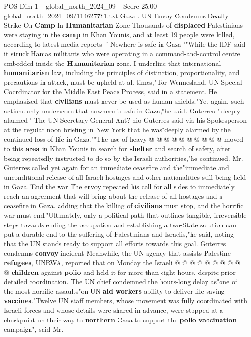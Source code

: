 \begin{textsample}{POS Dim 1 – global\_north\_2024\_09 – Score 25.00 – global\_north\_2024\_09/114627781.txt}  \label{ex:f1_pos_428}
Gaza : UN Envoy Condemns Deadly Strike On \textbf{Camp} In \textbf{Humanitarian} Zone Thousands of \textbf{displaced} Palestinians were staying in the \textbf{camp} in Khan Younis, and at least 19 people were killed, according to latest media reports. ' Nowhere is safe in Gaza '"While the IDF said it struck Hamas militants who were operating in a command-and-control centre embedded inside the \textbf{Humanitarian} zone, I underline that international \textbf{humanitarian} law, including the principles of distinction, proportionality, and precautions in attack, must be upheld at all times,"Tor Wennesland, UN Special Coordinator for the Middle East Peace Process, said in a statement.
He emphasized that \textbf{civilians} must never be used as human shields."Yet again, such actions only underscore that nowhere is safe in Gaza,"he said.
Guterres ' deeply alarmed ' The UN Secretary-General Ant? nio Guterres said via his Spokesperson at the regular noon briefing in New York that he was"deeply alarmed by the continued loss of life in Gaza.""The use of heavy @ @ @ @ @ @ @ @ @ @ moved to this \textbf{area} in Khan Younis in search for \textbf{shelter} and search of safety, after being repeatedly instructed to do so by the Israeli authorities,"he continued.
Mr.
Guterres called yet again for an immediate ceasefire and the"immediate and unconditional release of all Israeli hostages and other nationalities still being held in Gaza."End the war The envoy repeated his call for all sides to immediately reach an agreement that will bring about the release of all hostages and a ceasefire in Gaza, adding that the killing of \textbf{civilians} must stop, and the horrific war must end."Ultimately, only a political path that outlines tangible, irreversible steps towards ending the occupation and establishing a two-State solution can put a durable end to the suffering of Palestinians and Israelis,"he said, noting that the UN stands ready to support all efforts towards this goal.
Guterres condemns \textbf{convoy} incident Meanwhile, the UN agency that assists Palestine \textbf{refugees}, UNRWA, reported that on Monday the Israeli @ @ @ @ @ @ @ @ @ @ \textbf{children} against \textbf{polio} and held it for more than eight hours, despite prior detailed coordination.
The UN chief condemned the hours-long delay as"one of the most horrific assaults"on UN \textbf{aid} \textbf{workers} ability to deliver life-saving \textbf{vaccines}."Twelve UN staff members, whose movement was fully coordinated with Israeli forces and whose details were shared in advance, were stopped at a checkpoint on their way to \textbf{northern} Gaza to support the \textbf{polio} \textbf{vaccination} campaign", said Mr.

\end{textsample}
